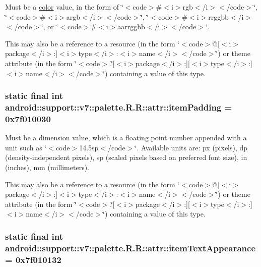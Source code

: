 Must be a \hyperlink{classandroid_1_1support_1_1v7_1_1palette_1_1_r_1_1color}{color} value, in the form of \char`\"{}$<$code$>$\#$<$i$>$rgb$<$/i$>$$<$/code$>$\char`\"{}, \char`\"{}$<$code$>$\#$<$i$>$argb$<$/i$>$$<$/code$>$\char`\"{}, \char`\"{}$<$code$>$\#$<$i$>$rrggbb$<$/i$>$$<$/code$>$\char`\"{}, or \char`\"{}$<$code$>$\#$<$i$>$aarrggbb$<$/i$>$$<$/code$>$\char`\"{}. 

This may also be a reference to a resource (in the form \char`\"{}$<$code$>$@\mbox{[}$<$i$>$package$<$/i$>$:\mbox{]}$<$i$>$type$<$/i$>$:$<$i$>$name$<$/i$>$$<$/code$>$\char`\"{}) or theme attribute (in the form \char`\"{}$<$code$>$?\mbox{[}$<$i$>$package$<$/i$>$:\mbox{]}\mbox{[}$<$i$>$type$<$/i$>$:\mbox{]}$<$i$>$name$<$/i$>$$<$/code$>$\char`\"{}) containing a value of this type. \hypertarget{classandroid_1_1support_1_1v7_1_1palette_1_1_r_1_1attr_ff02c370a887dcf3175eb32f3d072906}{
\subsubsection[{itemPadding}]{\setlength{\rightskip}{0pt plus 5cm}static final int android::support::v7::palette.R.R::attr::itemPadding = 0x7f010030}}
\label{classandroid_1_1support_1_1v7_1_1palette_1_1_r_1_1attr_ff02c370a887dcf3175eb32f3d072906}


Must be a dimension value, which is a floating point number appended with a unit such as \char`\"{}$<$code$>$14.5sp$<$/code$>$\char`\"{}. Available units are: px (pixels), dp (density-independent pixels), sp (scaled pixels based on preferred font size), in (inches), mm (millimeters). 

This may also be a reference to a resource (in the form \char`\"{}$<$code$>$@\mbox{[}$<$i$>$package$<$/i$>$:\mbox{]}$<$i$>$type$<$/i$>$:$<$i$>$name$<$/i$>$$<$/code$>$\char`\"{}) or theme attribute (in the form \char`\"{}$<$code$>$?\mbox{[}$<$i$>$package$<$/i$>$:\mbox{]}\mbox{[}$<$i$>$type$<$/i$>$:\mbox{]}$<$i$>$name$<$/i$>$$<$/code$>$\char`\"{}) containing a value of this type. \hypertarget{classandroid_1_1support_1_1v7_1_1palette_1_1_r_1_1attr_e879d5d3a2aa9fe23e479644b2ab1d33}{
\subsubsection[{itemTextAppearance}]{\setlength{\rightskip}{0pt plus 5cm}static final int android::support::v7::palette.R.R::attr::itemTextAppearance = 0x7f010132}}
\label{classandroid_1_1support_1_1v7_1_1palette_1_1_r_1_1attr_e879d5d3a2aa9fe23e479644b2ab1d33}


